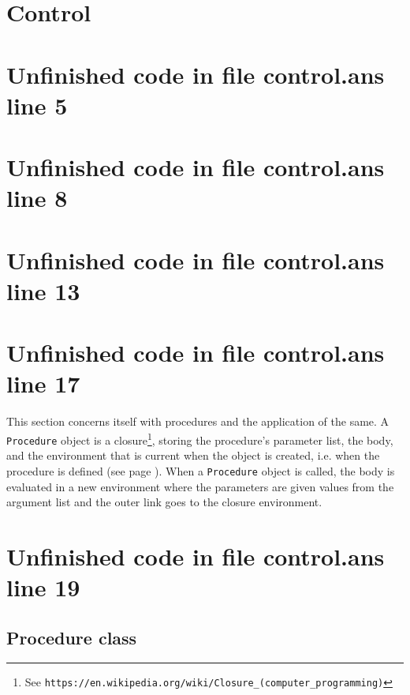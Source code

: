 \documentclass[twoside,9pt]{report}
\begin{document}
\section{Control}
\label{control}
\section{Unfinished code in file control.ans line 5}

\section{Unfinished code in file control.ans line 8}
\section{Unfinished code in file control.ans line 13}
\section{Unfinished code in file control.ans line 17}

This section concerns itself with procedures and the application of the same. A \texttt{Procedure} object is a closure\footnote{See \texttt{https://en.wikipedia.org/wiki/Closure\_(computer\_programming)}}, storing the procedure's parameter list, the body, and the environment that is current when the object is created, i.e. when the procedure is defined (see page \pageref{procedure-definition}). When a \texttt{Procedure} object is called, the body is evaluated in a new environment where the parameters are given values from the argument list and the outer link goes to the closure environment.

\section{Unfinished code in file control.ans line 19}
\subsection{Procedure class}
\label{procedure-class}
\end{document}
